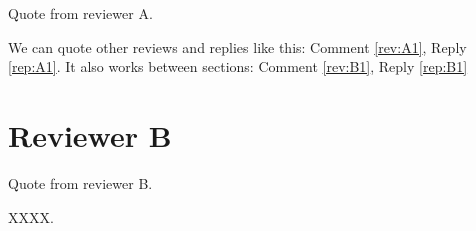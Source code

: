 \documentclass[11pt]{article}
\newcounter{reviewer} %
\newcounter{review}[section]
\newcounter{reply}[section]
\newcommand{\refrep}[1]{Reply \ref{#1}}
\newcommand{\refrev}[1]{Comment \ref{#1}}
\begin{document}
\begin{review}
Quote from reviewer A.
\end{review}

\begin{reply}
 We can quote other reviews and replies like this: \refrev{rev:A1}, \refrep{rep:A1}.
It also works between sections: \refrev{rev:B1}, \refrep{rep:B1}
\end{reply}


\section{Reviewer B}
\label{sec:B}

\begin{review}
\label{rev:B1}
Quote from reviewer B.
\end{review}

\begin{reply}
\label{rep:B1}
XXXX.
\end{reply}


\end{document}

